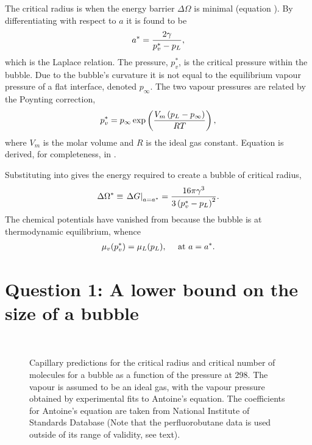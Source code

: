 The critical radius is  when the energy  barrier $\Delta \Omega$ is minimal (equation ).
By differentiating  with respect to $a$ it is found to be
\begin{align}
  {a^\ast} = \frac{2\gamma}{p_v^\ast-p_L}, \label{eqn:LaplaceRelation}
\end{align}
which is the Laplace relation.  The pressure, $p_v^\ast$, is the critical pressure within the bubble.
Due to the bubble's curvature  it is not equal to the equilibrium vapour pressure of a flat interface, 
denoted $p_\infty$. %
The two vapour pressures are related by the Poynting correction, 
\begin{align}
  p_v^\ast = p_\infty \exp \left(  \frac{V_m\left( p_L -p_\infty \right) }{R T}   \right),\label{eqn:PoyntingCorrection}
\end{align}
where $V_m$ is the molar volume  and $R$ is the ideal gas constant.
Equation  is derived, for completeness, in  .

Substituting  into  gives the energy required to create a bubble of  critical radius,
\begin{align}
   \Delta \Omega^\ast \equiv \left.{\Delta G}\right|_{a = {a^\ast}} = \frac{16\pi\gamma^3}{3\left( p_v^\ast- p_L \right)^2}.\label{eqn:DeltaGStar}
\end{align}
The chemical potentials have vanished from  because  the bubble is at thermodynamic equilibrium, whence
\begin{align}
  \mu_v(p_v^\ast) = \mu_L(p_L),\label{eqn:thermoEqlbm} \quad\text{ at $a = {a^\ast}$.}
\end{align} 



\section{Question 1: A lower bound on the size of a bubble}\label{sec:nuc:evacuate}

\begin{figure}
 \centering 
  \subfloat[]{ \label{fig:cnt:criticalRadius}}\\
  \subfloat[]{\label{fig:cnt:criticalNumber}}
\caption{
    Capillary predictions for the critical radius and critical number of molecules for a bubble as a function of the pressure at \unit{298}\kelvin.  
    The vapour is assumed to be an ideal gas, with the vapour pressure obtained by experimental fits to Antoine's equation.
    The coefficients for Antoine's equation are taken from National Institute of Standards Database\cite{NISTdata}
    (Note that the perfluorobutane data is used outside of its range of validity, see text).
  }
 \label{fig:cnt:nucleation_radius}
\end{figure}

